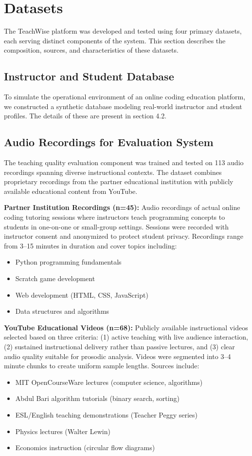 \section{Datasets}
The TeachWise platform was developed and tested using four primary datasets, each serving distinct components of the system. This section describes the composition, sources, and characteristics of these datasets.

\subsection{Instructor and Student Database}
To simulate the operational environment of an online coding education platform, we constructed a synthetic database modeling real-world instructor and student profiles. The details of these are present in section 4.2. 

\subsection{Audio Recordings for Evaluation System}
The teaching quality evaluation component was trained and tested on 113 audio recordings spanning diverse instructional contexts. The dataset combines proprietary recordings from the partner educational institution with publicly available educational content from YouTube.

\textbf{Partner Institution Recordings (n=45):}
Audio recordings of actual online coding tutoring sessions where instructors teach programming concepts to students in one-on-one or small-group settings. Sessions were recorded with instructor consent and anonymized to protect student privacy. Recordings range from 3--15 minutes in duration and cover topics including:
\begin{itemize}
    \item Python programming fundamentals
    \item Scratch game development
    \item Web development (HTML, CSS, JavaScript)
    \item Data structures and algorithms
\end{itemize}

\textbf{YouTube Educational Videos (n=68):}
Publicly available instructional videos selected based on three criteria: (1) active teaching with live audience interaction, (2) sustained instructional delivery rather than passive lectures, and (3) clear audio quality suitable for prosodic analysis. Videos were segmented into 3--4 minute chunks to create uniform sample lengths. Sources include:
\begin{itemize}
    \item MIT OpenCourseWare lectures (computer science, algorithms)
    \item Abdul Bari algorithm tutorials (binary search, sorting)
    \item ESL/English teaching demonstrations (Teacher Peggy series)
    \item Physics lectures (Walter Lewin)
    \item Economics instruction (circular flow diagrams)
\end{itemize}

